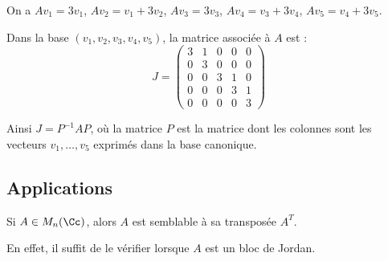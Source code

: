 \documentclass[12pt, class=report,crop=false]{standalone}
\begin{document}
\begin{exemple}
\begin{enumerate}
\begin{itemize}
  \end{itemize}
  On a $Av_1 = 3v_1$, $Av_2 = v_1+3v_2$, 
  $Av_3 = 3v_3$, $Av_4 = v_3+3v_4$, $Av_5 = v_4+3v_5$.
   
  Dans la base $(v_1,v_2,v_3,v_4,v_5)$, la matrice associée à $A$ est :
  $$J = \left(\begin{array}{cc|ccc}
  3 & 1 & 0 & 0 & 0 \\
0 & 3 & 0 & 0 & 0 \\\hline
0 & 0 & 3 & 1 & 0 \\
0 & 0 & 0 & 3 & 1 \\
0 & 0 & 0 & 0 & 3
  \end{array}\right)$$
  
Ainsi $J = P^{-1}AP$, où la matrice $P$ est la matrice dont les colonnes sont les vecteurs 
$v_1, \ldots, v_5$ exprimés dans la base canonique.


\end{enumerate}
\end{exemple}

\subsection{Applications}

\begin{exemple}
Si $A \in M_n(\Cc)$, alors $A$ est semblable à sa transposée $A^T$.

En effet, il suffit de le vérifier lorsque $A$ est un bloc de Jordan.
\end{exemple}
\end{document}
